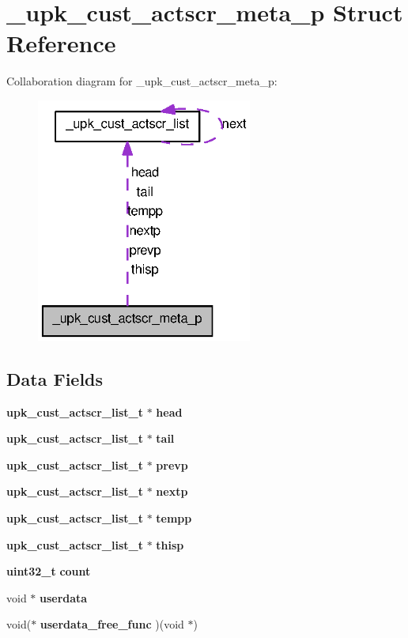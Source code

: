 \section{\_\-upk\_\-cust\_\-actscr\_\-meta\_\-p Struct Reference}
\label{struct__upk__cust__actscr__meta__p}


Collaboration diagram for \_\-upk\_\-cust\_\-actscr\_\-meta\_\-p:
\nopagebreak
\begin{figure}[H]
\begin{center}
\leavevmode
\includegraphics[width=201pt]{struct__upk__cust__actscr__meta__p__coll__graph}
\end{center}
\end{figure}
\subsection*{Data Fields}
\begin{DoxyCompactItemize}
\item 
{\bf upk\_\-cust\_\-actscr\_\-list\_\-t} $\ast$ {\bf head}
\item 
{\bf upk\_\-cust\_\-actscr\_\-list\_\-t} $\ast$ {\bf tail}
\item 
{\bf upk\_\-cust\_\-actscr\_\-list\_\-t} $\ast$ {\bf prevp}
\item 
{\bf upk\_\-cust\_\-actscr\_\-list\_\-t} $\ast$ {\bf nextp}
\item 
{\bf upk\_\-cust\_\-actscr\_\-list\_\-t} $\ast$ {\bf tempp}
\item 
{\bf upk\_\-cust\_\-actscr\_\-list\_\-t} $\ast$ {\bf thisp}
\item 
{\bf uint32\_\-t} {\bf count}
\item 
void $\ast$ {\bf userdata}
\item 
void($\ast$ {\bf userdata\_\-free\_\-func} )(void $\ast$)
\end{DoxyCompactItemize}


